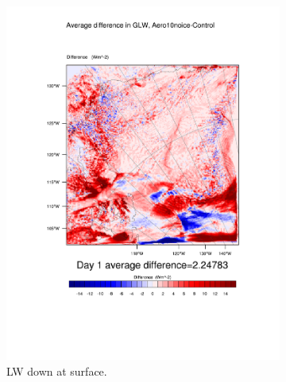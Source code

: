 \begin{figure}
	\begin{subfigure}{0.48\textwidth}
		\centering
		\includegraphics[width=\textwidth]{results/aero10ni/diff_Aero10NoIce_GLW_Day1.pdf}
		\caption{LW down at surface.}
		\label{subfig:glw_r4Day1}
	\end{subfigure}
	\quad
	\begin{subfigure}{0.48\textwidth}
		\centering

\end{subfigure}
\end{figure}
